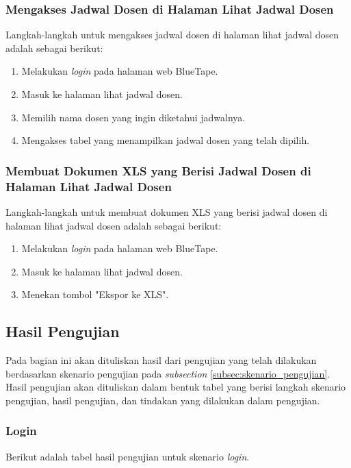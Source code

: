 \subsubsection{Mengakses Jadwal Dosen di Halaman Lihat Jadwal Dosen}
\label{subsubsec:skenario_mengakses_jadwal_dosen_di_halaman_lihat_jadwal_dosen}
Langkah-langkah untuk mengakses jadwal dosen di halaman lihat jadwal dosen adalah sebagai berikut:

\begin{enumerate}
    \item Melakukan \textit{login} pada halaman web BlueTape.
    \item Masuk ke halaman lihat jadwal dosen.
    \item Memilih nama dosen yang ingin diketahui jadwalnya.
    \item Mengakses tabel yang menampilkan jadwal dosen yang telah dipilih.
\end{enumerate}

\subsubsection{Membuat Dokumen XLS yang Berisi Jadwal Dosen di Halaman Lihat Jadwal Dosen}
\label{subsubsec:skenario_membuat_dokumen_xls_yang_berisi_jadwal_dosen_di_halaman_lihat_jadwal_dosen}
Langkah-langkah untuk membuat dokumen XLS yang berisi jadwal dosen di halaman lihat jadwal dosen adalah sebagai berikut:

\begin{enumerate}
    \item Melakukan \textit{login} pada halaman web BlueTape.
    \item Masuk ke halaman lihat jadwal dosen.
    \item Menekan tombol "Ekspor ke XLS".
\end{enumerate}

\subsection{Hasil Pengujian}
\label{subsec:hasil_pengujian}
Pada bagian ini akan dituliskan hasil dari pengujian yang telah dilakukan berdasarkan skenario pengujian pada \textit{subsection} \ref{subsec:skenario_pengujian}. Hasil pengujian akan dituliskan dalam bentuk tabel yang berisi langkah skenario pengujian, hasil pengujian, dan tindakan yang dilakukan dalam pengujian.

\subsubsection{Login}
\label{subsubsec:hasil_pengujian_login}
Berikut adalah tabel hasil pengujian untuk skenario \textit{login}.

